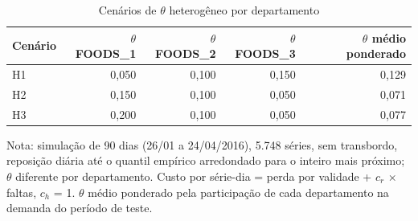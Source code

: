 \begin{table}[htbp]
\centering
\small
\caption{Cenários de $\theta$ heterogêneo por departamento}
\label{tab:het_cenarios}
\begin{tabular}{lrrrr}
\toprule
Cenário & $\theta$ FOODS\_1 & $\theta$ FOODS\_2 & $\theta$ FOODS\_3 & $\theta$ médio ponderado \\
\midrule
H1 & 0,050 & 0,100 & 0,150 & 0,129 \\
H2 & 0,150 & 0,100 & 0,050 & 0,071 \\
H3 & 0,200 & 0,100 & 0,050 & 0,077 \\
\bottomrule
\end{tabular}
\par\smallskip
{\footnotesize Nota: simulação de 90 dias (26/01 a 24/04/2016), 5.748 séries, sem transbordo, reposição diária até o quantil empírico arredondado para o inteiro mais próximo; $\theta$ diferente por departamento. Custo por série-dia = perda por validade + $c_r$ × faltas, $c_h$ = 1. $\theta$ médio ponderado pela participação de cada departamento na demanda do período de teste.}
\end{table}
